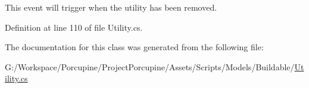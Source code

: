 This event will trigger when the utility has been removed. 



Definition at line 110 of file Utility.\+cs.



The documentation for this class was generated from the following file\+:\begin{DoxyCompactItemize}
\item 
G\+:/\+Workspace/\+Porcupine/\+Project\+Porcupine/\+Assets/\+Scripts/\+Models/\+Buildable/\hyperlink{_utility_8cs}{Utility.\+cs}\end{DoxyCompactItemize}

